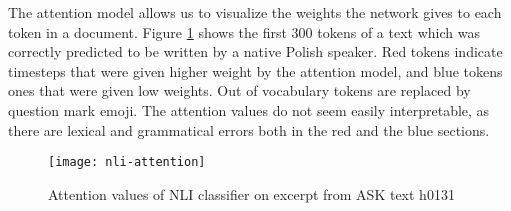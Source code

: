 The attention model allows us to visualize the weights the network gives to
each token in a document. Figure \ref{fig:nli-attention} shows the first 300
tokens of a text which was correctly predicted to be written by a native Polish
speaker. Red tokens indicate timesteps that were given higher weight by the attention
model, and blue tokens ones that were given low weights. Out of vocabulary tokens
are replaced by question mark emoji. The attention values do not seem easily
interpretable, as there are lexical and grammatical errors both in the red and
the blue sections.

\begin{figure}
  \centering
  \texttt{[image: nli-attention]}
  \caption{Attention values of NLI classifier on excerpt from ASK text h0131}
  \label{fig:nli-attention}
\end{figure}

